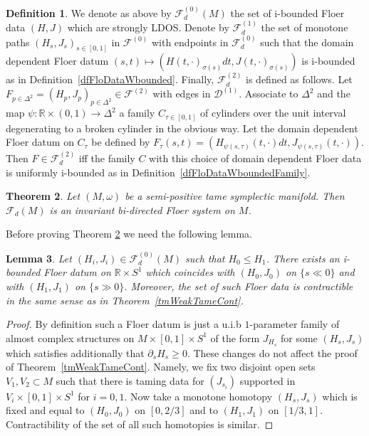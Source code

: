 \documentclass[11pt]{amsart}
\newcommand{\R}{\mathbb{R}}
\newtheorem{tm}{Theorem}[section]
\newtheorem{lm}[tm]{Lemma}
\theoremstyle{definition}
\newtheorem{df}[tm]{Definition}
\theoremstyle{remark}
\begin{document}
\begin{df}\label{dfAdmSiAb}
We denote as above by $\mathcal{F}_d^{(0)}(M)$ the set of i-bounded Floer data $(H,J)$ which are strongly LDOS. Denote by $\mathcal{F}_d^{(1)}$ the set of monotone paths $(H_s,J_s)_{s\in[0,1]}$ in $\mathcal{F}^{(0)}$ with endpoints in $\mathcal{F}_d^{(0)}$ such that the domain dependent Floer datum $(s,t)\mapsto (H(t,\cdot)_{\sigma(s)}dt,J(t,\cdot)_{\sigma(s)})$ is i-bounded as in Definition~\ref{dfFloDataWbounded}. Finally, $\mathcal{F}_d^{(2)}$ is defined as follows. Let $F_{p\in \Delta^2}=(H_p,J_p)_{p\in \Delta^2}\in\mathcal{F}^{(2)}$ with edges in $\mathcal{D}^{(1)}$. Associate to $\Delta^2$ and the map $\psi:\R\times (0,1)\to\Delta^2$ a family $C_{ \tau\in[0,1]}$ of cylinders over the unit interval degenerating to a broken cylinder in the obvious way. Let the domain dependent Floer datum on $C_\tau$ be defined by $F_{\tau}(s,t)=(H_{\psi(s,\tau)}(t,\cdot)dt,J_{\psi(s,\tau)}(t,\cdot))$. Then $F\in\mathcal{F}_d^{(2)}$ iff the family $C$ with this choice of domain dependent Floer data is uniformly i-bounded as in Definition~\ref{dfFloDataWboundedFamily}.
\end{df}
\begin{tm}\label{TmMain}
Let $(M,\omega)$ be a semi-positive tame symplectic manifold. Then $\mathcal{F}_d(M)$ is an invariant bi-directed Floer system on $M$.
\end{tm}

Before proving Theorem \ref{TmMain} we need the following lemma.
\begin{lm}\label{lmAdmConn}
Let $(H_i,J_i)\in\mathcal{F}_d^{(0)}(M)$ such that $H_0\leq H_1$. There exists an i-bounded Floer datum on $\R\times S^1$ which coincides with $(H_0,J_0)$ on $\{s\ll0\}$ and with $(H_1,J_1)$ on $\{s\gg0\}$. Moreover, the set of such Floer data is contractible in the same sense as in Theorem~\ref{tmWeakTameCont}.
\end{lm}
\begin{proof}
By definition such a Floer datum is just a u.i.b $1$-parameter family of almost complex structures on $M\times [0,1]\times S^1$ of the form $J_{H_s}$ for some $(H_s,J_s)$ which satisfies additionally that $\partial_sH_s\geq 0.$ These changes do not affect the proof of Theorem~\ref{tmWeakTameCont}. Namely, we fix two disjoint open sets $V_1,V_2\subset M$ such that there is taming data for $(J_{s_i})$ supported in $V_i\times [0,1]\times S^1$ for $i=0,1$. Now take a monotone homotopy $(H_s,J_s)$ which is fixed and equal to $(H_0,J_0)$ on $[0,2/3]$  and to $(H_1,J_1)$ on $[1/3,1]$. Contractibility of the set of all such homotopies is similar.
\end{proof}
\end{document}
